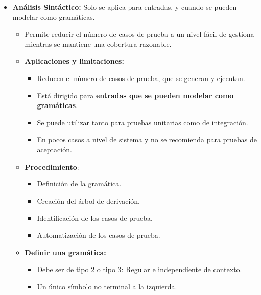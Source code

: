 \documentclass[12pt, twoside, openright]{report} %
\begin{document}
\begin{itemize}
\item \textbf{Análisis Sintáctico:} Solo se aplica para entradas, y cuando
  se pueden modelar como gramáticas.

  \begin{itemize}
  \item Permite reducir el número de casos de prueba a un nivel fácil de
    gestiona mientras se mantiene una cobertura razonable.
    
  \item \textbf{Aplicaciones y limitaciones:}
    

    \begin{itemize}
    \item Reducen el número de casos de prueba, que se generan y ejecutan.
      
    \item Está dirigido para \textbf{entradas que se pueden modelar como
      gramáticas}.
      
    \item Se puede utilizar tanto para pruebas unitarias como de
      integración.
      
    \item En pocos casos a nivel de sistema y no se recomienda para pruebas
      de aceptación.
      
    \end{itemize}
  \item \textbf{Procedimiento}:
    

    \begin{itemize}
    \item Definición de la gramática.
      
    \item Creación del árbol de derivación.
      
    \item Identificación de los casos de prueba.
      
    \item Automatización de los casos de prueba.
      
    \end{itemize}
  \item \textbf{Definir una gramática:}
    

    \begin{itemize}
    \item Debe ser de tipo 2 o tipo 3: Regular e independiente de contexto.
      
    \item Un único símbolo no terminal a la izquierda.
      

\end{itemize}
\end{itemize}
\end{itemize}
\end{document}
